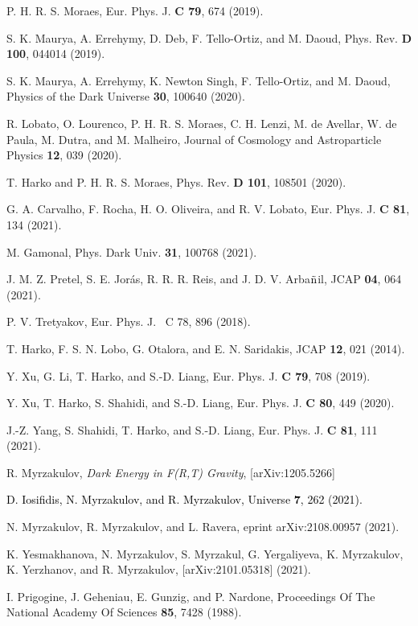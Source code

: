 \documentclass[aps,superscriptaddress, showpacs,preprintnumbers, superscriptaddress, nofootinbibt,twocolumn]{revtex4}
\newcommand{\te}[1]{\textcolor{black}{#1}}
\begin{document}
\begin{thebibliography}{99}
 P. H. R. S. Moraes, Eur. Phys. J. {\bf C 79}, 674  (2019).

 S. K. Maurya, A. Errehymy, D. Deb, F. Tello-Ortiz, and M. Daoud, Phys. Rev. {\bf D 100}, 044014 (2019).

 S. K. Maurya, A. Errehymy, K. Newton Singh, F. Tello-Ortiz, and M. Daoud, Physics of the Dark Universe {\bf 30},  100640 (2020).

 R. Lobato, O. Lourenco, P. H. R. S. Moraes, C. H. Lenzi, M. de Avellar, W. de Paula, M. Dutra, and M. Malheiro, Journal of Cosmology and Astroparticle Physics {\bf 12},  039 (2020).

 T. Harko and P. H. R. S. Moraes, Phys. Rev. {\bf D 101}, 108501 (2020).

 G. A. Carvalho, F. Rocha, H. O. Oliveira, and R. V. Lobato, Eur. Phys. J. {\bf C  81}, 134 (2021).

 M. Gamonal, Phys. Dark Univ. {\bf 31}, 100768 (2021).

 J. M. Z. Pretel, S. E. Jor\'{a}s, R. R. R. Reis, and J. D. V. Arba$\tilde{{\rm n}}$il, 	JCAP {\bf 04},  064 (2021).

 P. V. Tretyakov, Eur. Phys. J. {\ C 78},  896 (2018).

 T. Harko, F. S. N. Lobo, G. Otalora, and E. N. Saridakis, JCAP {\bf 12},  021 (2014).

 Y. Xu, G. Li, T. Harko, and S.-D. Liang, Eur. Phys. J. {\bf C 79}, 708 (2019).

 Y. Xu, T. Harko, S. Shahidi, and S.-D. Liang, Eur. Phys. J. {\bf C 80}, 449 (2020).

 J.-Z. Yang, S. Shahidi, T. Harko, and S.-D. Liang, Eur. Phys. J. {\bf C 81}, 111 (2021).

  R. Myrzakulov, \textit{Dark Energy in F(R,T) Gravity},  [arXiv:1205.5266]

\te{  D. Iosifidis, N. Myrzakulov, and R. Myrzakulov, Universe {\bf 7},  262 (2021).}

  N. Myrzakulov, R. Myrzakulov, and L. Ravera, eprint arXiv:2108.00957 (2021).

 K. Yesmakhanova, N. Myrzakulov, S. Myrzakul, G. Yergaliyeva, K. Myrzakulov, K. Yerzhanov, and R. Myrzakulov,  [arXiv:2101.05318] (2021).

 I. Prigogine, J. Geheniau, E. Gunzig, and P. Nardone,
Proceedings Of The National Academy Of Sciences \textbf{85}, 7428 (1988).


\end{thebibliography}
\end{document}
